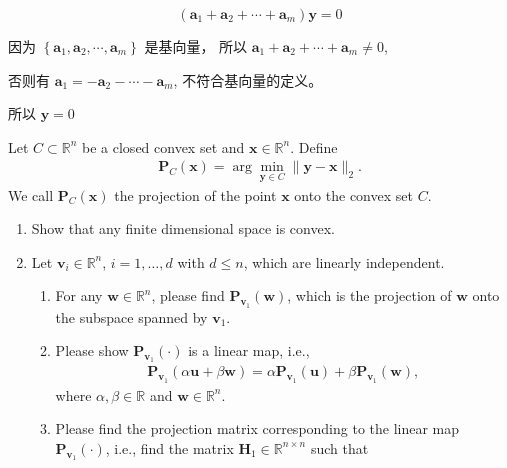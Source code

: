 \documentclass[11pt,letter,notitlepage]{article}
\newcommand{\proj}[2]{\textbf{P}_{#2} (#1)}
\begin{document}
\begin{solution}
\begin{enumerate}
\begin{enumerate}
\begin{enumerate}
				                  $$(\mathbf{a}_1+\mathbf{a}_2+\cdots+\mathbf{a}_m)\mathbf{y}=0$$

				                  因为 $\left\{\mathbf{a}_1, \mathbf{a}_2,\cdots,\mathbf{a}_m\right\}$ 是基向量， 所以 $\mathbf{a}_1+\mathbf{a}_2+\cdots+\mathbf{a}_m \neq 0$,

				                  否则有 $\mathbf{a}_1=-\mathbf{a}_2-\cdots-\mathbf{a}_m$, 不符合基向量的定义。

				                  所以 $\mathbf{y}=0$

			            \end{enumerate}
		      \end{enumerate}
	\end{enumerate}
\end{solution}
\newpage

\begin{exercise}
	Let $C \subset \mathbb{R}^n$ be a closed convex set and $\mathbf{x} \in \mathbb{R}^n$. Define
	\begin{align*}
		\proj{\mathbf{x}}{C} = \arg\min_{\mathbf{y} \in C}\| \mathbf{y} - \mathbf{x} \|_2.
	\end{align*}
	We call $\proj{\mathbf{x}}{C}$ the projection of the point $\mathbf{x}$ onto the convex set $C$.
	\begin{enumerate}
		\item Show that any finite dimensional space is convex.
		\item Let $\mathbf{v}_i \in \mathbb{R}^n$, $i=1,\ldots,d$ with $d\leq n$, which are linearly independent.
		      \begin{enumerate}
			      \item For any $\mathbf{w}\in \mathbb{R}^n$, please find $\proj{\mathbf{w}}{\mathbf{v}_1}$, which is the projection of $\mathbf{w}$ onto the subspace spanned by $\mathbf{v}_1$.
			      \item Please show $\proj{\cdot}{\mathbf{v}_1}$ is a linear map, i.e.,
			            \begin{align*}
				            \proj{\alpha\mathbf{u}+\beta\mathbf{w}}{\mathbf{v}_1}=\alpha\proj{\mathbf{u}}{\mathbf{v}_1} + \beta \proj{\mathbf{w}}{\mathbf{v}_1},
			            \end{align*}
			            where $\alpha,\beta\in\mathbb{R}$ and $\mathbf{w}\in\mathbb{R}^n$.
			      \item Please find the projection matrix corresponding to the linear map $\proj{\cdot}{\mathbf{v}_1}$, i.e., find the matrix $\mathbf{H}_1\in\mathbb{R}^{n\times n}$ such that

\end{enumerate}
\end{enumerate}
\end{exercise}
\end{document}
